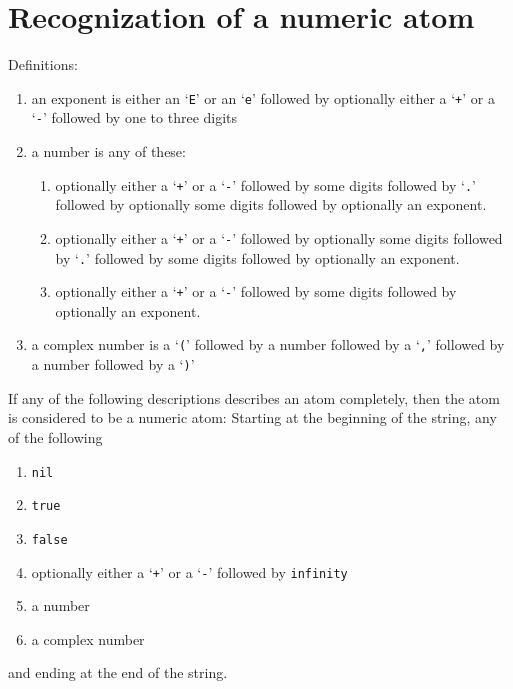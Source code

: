 \documentclass[12pt]{article}
\begin{document}
\section*{Recognization of a numeric atom}
Definitions:
\begin{enumerate}
\item an exponent is either an `\verb+E+' or an `\verb+e+'
      followed by optionally either a `\verb|+|' or a `\verb|-|'
      followed by one to three digits
\item a number is any of these:
\begin{enumerate}
\item optionally either a `\verb|+|' or a `\verb|-|'
      followed by some digits
      followed by `\verb+.+'
      followed by optionally some digits
      followed by optionally an exponent.
\item optionally either a `\verb|+|' or a `\verb|-|'
      followed by optionally some digits
      followed by `\verb+.+'
      followed by some digits
      followed by optionally an exponent.
\item optionally either a `\verb|+|' or a `\verb|-|'
      followed by some digits
      followed by optionally an exponent.
\end{enumerate}
\item a complex number is a `\verb+(+' followed by a number 
      followed by a `\verb+,+' followed by a number followed by a `\verb+)+'
\end{enumerate}

If any of the following descriptions describes an atom completely,
then the atom is considered to be a numeric atom:
Starting at the beginning of the string, any of the following
\begin{enumerate}
\item {\tt nil}
\item {\tt true}
\item {\tt false}
\item optionally either a `\verb|+|' or a `\verb|-|' followed by {\tt infinity}
\item a number
\item a complex number
\end{enumerate}
and ending at the end of the string.
\end{document}
